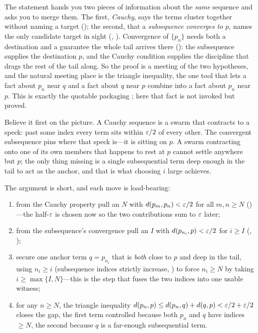 \documentclass[main.tex]{subfiles}
\begin{document}
\begin{Reflection}
The statement hands you two pieces of information about the \emph{same} sequence and asks you to merge
them. The first, \emph{Cauchy}, says the terms cluster together without naming a target ();
the second, that a \emph{subsequence converges to $p$}, names the only candidate target in sight
(, ). Convergence of $\{p_n\}$ needs both a destination and a guarantee the
whole tail arrives there (): the subsequence supplies the destination $p$, and the Cauchy
condition supplies the discipline that drags the rest of the tail along. So the proof is a meeting of
the two hypotheses, and the natural meeting place is the triangle inequality, the one tool that lets a
fact about $p_n$ near $q$ and a fact about $q$ near $p$ combine into a fact about $p_n$ near $p$. This
is exactly the quotable packaging ; here that fact is not invoked but proved.

Believe it first on the picture. A Cauchy sequence is a swarm that contracts to a speck: past some
index every term sits within $\varepsilon/2$ of every other. The convergent subsequence pins where that speck
is---it is sitting on $p$. A swarm contracting onto one of its own members that happens to rest at $p$
cannot settle anywhere but $p$; the only thing missing is a single subsequential term deep enough in
the tail to act as the anchor, and that is what choosing $i$ large achieves.

The argument is short, and each move is load-bearing:
\begin{enumerate}[leftmargin=1.7em,itemsep=3pt,topsep=2pt,label=\textnormal{(\arabic*)}]
  \item from the Cauchy property pull an $N$ with $d(p_m,p_n)<\varepsilon/2$ for all $m,n\ge N$
        ()---the half-$\varepsilon$ is chosen now so the two contributions sum to $\varepsilon$ later;
  \item from the subsequence's convergence pull an $I$ with $d(p_{n_i},p)<\varepsilon/2$ for $i\ge I$
        (, );
  \item secure one anchor term $q=p_{n_i}$ that is \emph{both} close to $p$ and deep in the tail, using
        $n_i\ge i$ (subsequence indices strictly increase, ) to force $n_i\ge N$ by taking
        $i\ge\max\{I,N\}$---this is the step that fuses the two indices into one usable witness;
  \item for any $n\ge N$, the triangle inequality $d(p_n,p)\le d(p_n,q)+d(q,p)<\varepsilon/2+\varepsilon/2$ closes the
        gap, the first term controlled because both $p_n$ and $q$ have indices $\ge N$, the second
        because $q$ is a far-enough subsequential term.
\end{enumerate}


\end{Reflection}
\end{document}
